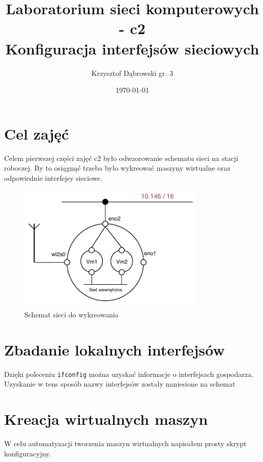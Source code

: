 \documentclass{mwart}
\title{Laboratorium sieci komputerowych - c2 \\ Konfiguracja interfejsów sieciowych}
\author{Krzysztof Dąbrowski gr. 3}
\date{\today}
\begin{document}
\maketitle{}
\tableofcontents{}

\section{Cel zajęć}
Celem pierwszej części zajęć c2 było odwzorowanie schematu sieci na stacji roboczej. By to osiągnąć trzeba było wykreować maszyny wirtualne oraz odpowiednie interfejsy sieciowe.

\begin{figure}[h]
    \includegraphics[width=0.80\textwidth]{schemat}
    \centering
    \caption{Schemat sieci do wykreowania}
    \label{fig:schemat}
\end{figure}

\section{Zbadanie lokalnych interfejsów}
Dzięki poleceniu \texttt{ifconfig} można uzyskać informacje o interfejsach gospodarza. Uzyskanie w tens sposób nazwy interfejsów zostały naniesione na schemat %

\section{Kreacja wirtualnych maszyn}
W celu automatyzacji tworzenia maszyn wirtualnych napisałem prosty skrypt konfiguracyjny.


\end{document}
